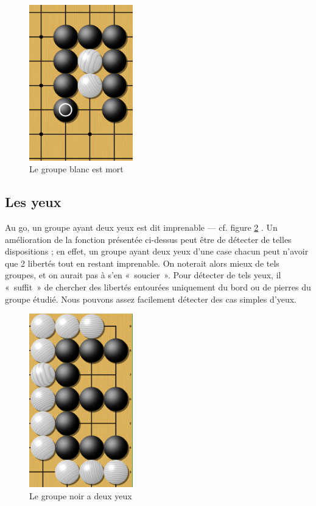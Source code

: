\documentclass[11pt,a4paper,titlepage,french]{article}
\begin{document}
			\begin{figure}[hbt]
			\label{groupemort}
			\begin{center}
			\includegraphics[width=0.4\textwidth]{groupemort.png}
			\end{center}
			\caption{Le groupe blanc est mort}

			\end{figure}

		\subsection{Les yeux}
			Au go, un groupe ayant deux yeux est dit imprenable --- cf. figure \ref{deuxyeux} . Un amélioration de la fonction présentée ci-dessus peut être de détecter de telles dispositions ; en effet, un groupe ayant deux yeux d'une case chacun peut n'avoir que 2 libertés tout en restant imprenable. On noterait alors mieux de tels groupes, et on aurait pas à s'en «~soucier~». Pour détecter de tels yeux, il «~suffit~» de chercher des libertés entourées uniquement du bord ou de pierres du groupe étudié. Nous pouvons assez facilement détecter des cas simples d'yeux.

			\begin{figure}[hbt]
			\label{deuxyeux}
			\begin{center}
			\includegraphics[width=0.4\textwidth]{deuxyeux.png}
			\end{center}
			\caption{Le groupe noir a deux yeux}
			\end{figure}
\end{document}
